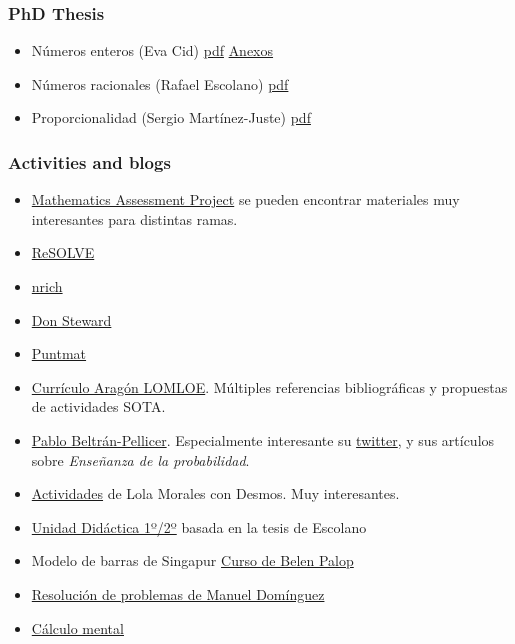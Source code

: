 \subsubsection*{PhD Thesis}

\begin{itemize}
  \item Números enteros (Eva Cid) \href{https://web.archive.org/web/20210119170137/http://www.atd-tad.org/wp-content/uploads/2016/12/TESIS_EVA_CID-1.pdf}{pdf} \href{https://drive.google.com/file/d/0B0VFDUr_rGnYcjlSMDZfdkxscHM/view?usp=sharing}{Anexos}
  \item Números racionales (Rafael Escolano) \href{https://zaguan.unizar.es/record/84666/files/TESIS-2019-167.pdf}{pdf}
  \item Proporcionalidad (Sergio Martínez-Juste) \href{https://uvadoc.uva.es/handle/10324/52863}{pdf}
\end{itemize}

\subsubsection*{Activities and blogs}

\begin{itemize}
  \item \href{https://www.map.mathshell.org/index.php}{Mathematics Assessment Project} se pueden encontrar materiales muy interesantes para distintas ramas.
  \item \href{https://resolve.edu.au/teaching-resources}{ReSOLVE}
  \item \href{https://nrich.maths.org/maps/secondary}{nrich}
  \item \href{https://donsteward.blogspot.com}{Don Steward}
  \item \href{http://puntmat.blogspot.com}{Puntmat}
  \item \href{https://educa.aragon.es/documents/20126/2773111/%5B02.26%5D+Matem%C3%A1ticas.pdf/db9a15af-ba0a-e11e-5c13-a7c78ce6f901?t=1661254613594}{Currículo Aragón LOMLOE}. Múltiples referencias bibliográficas y propuestas de actividades SOTA.
  \item \href{https://tierradenumeros.com/}{Pablo Beltrán-Pellicer}. Especialmente interesante su \href{https://twitter.com/pbeltranp}{twitter}, y sus artículos sobre \emph{Enseñanza de la probabilidad}.
  \item \href{https://docs.google.com/spreadsheets/d/1N7LqzVwYC8UVUWKfm4ERPJ1dqVJwRHofIAMz6mS1vvo/edit#gid=0}{Actividades} de Lola Morales con Desmos. Muy interesantes.
  \item \href{https://twitter.com/SergioMJGR/status/1233098923029471232}{Unidad Didáctica 1º/2º} basada en la tesis de Escolano
  \item Modelo de barras de Singapur \href{https://sites.google.com/view/modelodebarras/home}{Curso de Belen Palop}
  \item \href{https://www.educa2.madrid.org/web/matesatulado/numeros-naturales}{Resolución de problemas de Manuel Domínguez}
  \item \href{http://docentes.educacion.navarra.es/jjimenei/index.html}{Cálculo mental}
\end{itemize}

